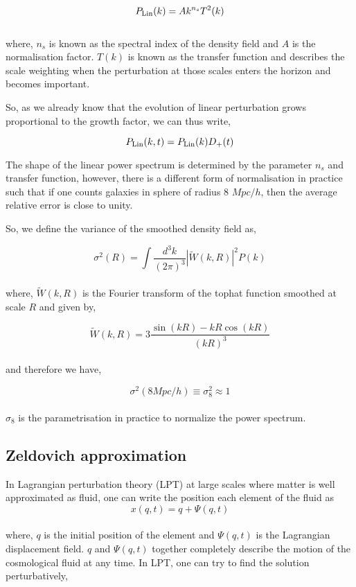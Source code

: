 \begin{equation}
	P_{\rm Lin}(k) = A k^{n_s} T^2(k)
\end{equation}
\\
where, $n_s$ is known as the spectral index of the density field and $A$ is the
normalisation factor. $T(k)$ is known as the transfer function and describes
the scale weighting when the perturbation at those scales enters the horizon
and becomes important. 

So, as we already know that the evolution of linear perturbation grows 
proportional to the growth factor, we can thus write,

\begin{equation}
	P_{\rm Lin}(k,t) = P_{\rm Lin}(k) D_+(t)
\end{equation}

The shape of the linear power spectrum is determined by the parameter $n_s$ and 
transfer function, however, there is a different form of normalisation in 
practice such that if one counts galaxies in sphere of radius 8 $Mpc/h$, then
the average relative error is close to unity. 

So, we define the variance of the smoothed density field as,

\begin{equation}
	\sigma^2(R) = \int \dfrac{d^3k}{(2\pi)^3} |\tilde{W}(k,R)|^2 P(k)
\end{equation}
\\
where, $\tilde{W}(k,R)$ is the Fourier transform of the tophat function smoothed 
at scale $R$ and given by,

\begin{equation}
	\tilde{W}(k,R) = 3\dfrac{\sin(kR) - kR \cos(kR)}{(kR)^3}
\end{equation}
\\
and therefore we have,

\begin{equation}
	\sigma^2(8 Mpc/h) \equiv \sigma_8^2 \approx 1
\end{equation}
\\
$\sigma_8$ is the parametrisation in practice to normalize the power
spectrum. 

\subsection{Zeldovich approximation}

In Lagrangian perturbation theory (LPT) \cite{} at large scales where matter is
well approximated as fluid, one can write the position each element of the fluid as
\begin{equation}
	x(q,t) = q + \Psi(q,t)
\end{equation}
\\
where, $q$ is the initial position of the element and $\Psi(q,t)$ is the Lagrangian
displacement field. $q$ and $\Psi(q,t)$ together completely describe the motion
of the cosmological fluid at any time. In LPT, one can try to find the solution 
perturbatively,

